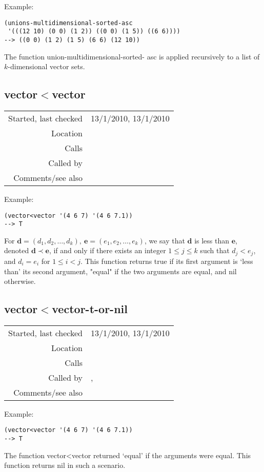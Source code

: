 \vspace{0.5cm}
\noindent Example:
\begin{verbatim}
(unions-multidimensional-sorted-asc
 '(((12 10) (0 0) (1 2)) ((0 0) (1 5)) ((6 6))))
--> ((0 0) (1 2) (1 5) (6 6) (12 10))
\end{verbatim}

\noindent The function union-multidimensional-sorted-
asc is applied recursively to a list of $k$-dimensional vector sets.


\subsection*{vector$<$vector}\label{fun:vector<vector}

\vspace{0.3cm}
\begin{tabular}{r|p{8cm}}
Started, last checked & 13/1/2010, 13/1/2010 \\
Location & \nameref{sec:set-operations} \\
Calls & \\
Called by & \nameref{fun:insert-retaining-sorted-asc} \\
Comments/see also &
\end{tabular}

\vspace{0.5cm}
\noindent Example:
\begin{verbatim}
(vector<vector '(4 6 7) '(4 6 7.1))
--> T
\end{verbatim}

\noindent For $\mathbf{d} = (d_1, d_2,\ldots, d_k), \
\mathbf{e} = (e_1, e_2,\ldots, e_k)$, we say that
$\mathbf{d}$ is less than $\mathbf{e}$,
denoted $\mathbf{d} \prec \mathbf{e}$, if and only if
there exists an integer $1 \leq j \leq k$ such that
$d_j < e_j$, and $d_i = e_i$ for $1 \leq i < j$. This
function returns true if its first argument is `less
than' its second argument, "equal" if the two
arguments are equal, and nil otherwise.


\subsection*{vector$<$vector-t-or-nil}\label{fun:vector<vector-t-or-nil}

\vspace{0.3cm}
\begin{tabular}{r|p{8cm}}
Started, last checked & 13/1/2010, 13/1/2010 \\
Location & \nameref{sec:set-operations} \\
Calls & \\
Called by & \nameref{fun:difference-list-sorted-asc},\newline \nameref{fun:translate-pattern-to-1st-occurrence} \\
Comments/see also &
\end{tabular}

\vspace{0.5cm}
\noindent Example:
\begin{verbatim}
(vector<vector '(4 6 7) '(4 6 7.1))
--> T
\end{verbatim}

\noindent The function vector<vector returned `equal'
if the arguments were equal. This function returns nil
in such a scenario.

